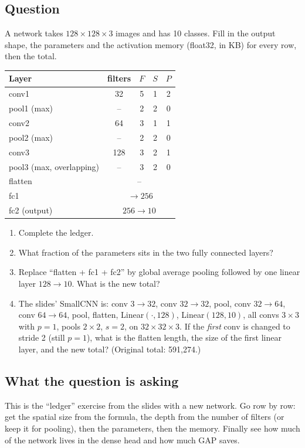 \documentclass[12pt,a4paper]{article}
\newcommand{\hlq}[1]{{\setlength{\fboxsep}{1.5pt}\colorbox{yellow}{#1}}}
\begin{document}
\subsection*{Question}
A network takes $128\times128\times3$ images and has 10 classes. Fill in the output shape, the parameters and the activation memory (float32, in KB) for every row, then the total.
\begin{center}
\begin{tabular}{@{}lcccc@{}}
\toprule
Layer & filters & $F$ & $S$ & $P$\\
\midrule
conv1 & 32 & 5 & 1 & 2\\
pool1 (max) & -- & 2 & 2 & 0\\
conv2 & 64 & 3 & 1 & 1\\
pool2 (max) & -- & 2 & 2 & 0\\
conv3 & 128 & 3 & 2 & 1\\
pool3 (max, overlapping) & -- & 3 & 2 & 0\\
flatten & \multicolumn{4}{c}{--}\\
fc1 & \multicolumn{4}{c}{$\;\to256$}\\
fc2 (output) & \multicolumn{4}{c}{$256\to10$}\\
\bottomrule
\end{tabular}
\end{center}
\begin{enumerate}[label=(\alph*)]
\item[\hlq{(a)}] Complete the ledger.
\item[\hlq{(b)}] What fraction of the parameters sits in the two fully connected layers?
\item[(c)] Replace ``flatten + fc1 + fc2'' by global average pooling followed by one linear layer $128\to10$. What is the new total?
\item[\hlq{(d)}] The slides' SmallCNN is: conv $3\to32$, conv $32\to32$, pool, conv $32\to64$, conv $64\to64$, pool, flatten, Linear$(\cdot,128)$, Linear$(128,10)$, all convs $3\times3$ with $p=1$, pools $2\times2$, $s=2$, on $32\times32\times3$. If the \emph{first} conv is changed to stride 2 (still $p=1$), what is the flatten length, the size of the first linear layer, and the new total? (Original total: 591{,}274.)
\end{enumerate}

\subsection*{What the question is asking}
This is the ``ledger'' exercise from the slides with a new network. Go row by row: get the spatial size from the formula, the depth from the number of filters (or keep it for pooling), then the parameters, then the memory. Finally see how much of the network lives in the dense head and how much GAP saves.
\end{document}
